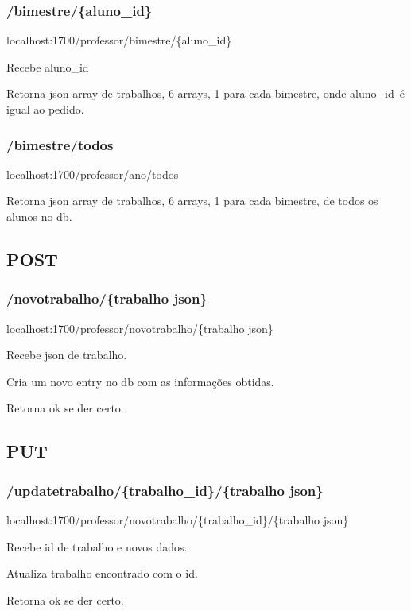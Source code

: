 \documentclass[../main.tex]{subfiles}
\begin{document}
\subsubsection{/bimestre/\{aluno\_id\}}
localhost:1700/professor/bimestre/\{aluno\_id\} \par

Recebe aluno\_id\ \par
Retorna json array de trabalhos, 6 arrays, 1 para cada bimestre, onde aluno\_id\ é igual ao pedido. \newline

\subsubsection{/bimestre/todos}
localhost:1700/professor/ano/todos \par

Retorna json array de trabalhos, 6 arrays, 1 para cada bimestre, de todos os alunos no db. \newline

\subsection{POST}

\subsubsection{/novotrabalho/\{trabalho json\}}
localhost:1700/professor/novotrabalho/\{trabalho json\} \par

Recebe json de trabalho. \par 
Cria um novo entry no db com as informações obtidas. \par
Retorna ok se der certo. \newline

\subsection{PUT}

\subsubsection{/updatetrabalho/\{trabalho\_id\}/\{trabalho json\}}
localhost:1700/professor/novotrabalho/\{trabalho\_id\}/\{trabalho json\} \par

Recebe id de trabalho e novos dados. \par 
Atualiza trabalho encontrado com o id. \par
Retorna ok se der certo. \newline
\end{document}
